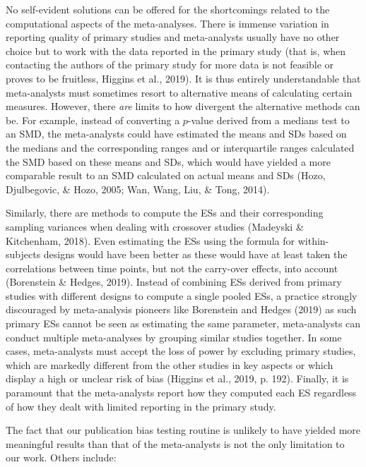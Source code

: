 \documentclass[
  man,floatsintext]{apa6}
\begin{document}
No self-evident solutions can be offered for the shortcomings related to the computational aspects of the meta-analyses. There is immense variation in reporting quality of primary studies and meta-analysts usually have no other choice but to work with the data reported in the primary study (that is, when contacting the authors of the primary study for more data is not feasible or proves to be fruitless, Higgins et al., 2019). It is thus entirely understandable that meta-analysts must sometimes resort to alternative means of calculating certain measures. However, there \emph{are} limits to how divergent the alternative methods can be. For example, instead of converting a \(p\)-value derived from a medians test to an SMD, the meta-analysts could have estimated the means and SDs based on the medians and the corresponding ranges and or interquartile ranges calculated the SMD based on these means and SDs, which would have yielded a more comparable result to an SMD calculated on actual means and SDs (Hozo, Djulbegovic, \& Hozo, 2005; Wan, Wang, Liu, \& Tong, 2014).

Similarly, there are methods to compute the ESs and their corresponding sampling variances when dealing with crossover studies (Madeyski \& Kitchenham, 2018). Even estimating the ESs using the formula for within-subjects designs would have been better as these would have at least taken the correlations between time points, but not the carry-over effects, into account (Borenstein \& Hedges, 2019).
Instead of combining ESs derived from primary studies with different designs to compute a single pooled ESs, a practice strongly discouraged by meta-analysis pioneers like Borenstein and Hedges (2019) as such primary ESs cannot be seen as estimating the same parameter, meta-analysts can conduct multiple meta-analyses by grouping similar studies together. In some cases, meta-analysts must accept the loss of power by excluding primary studies, which are markedly different from the other studies in key aspects or which display a high or unclear risk of bias (Higgins et al., 2019, p. 192). Finally, it is paramount that the meta-analysts report how they computed each ES regardless of how they dealt with limited reporting in the primary study.

The fact that our publication bias testing routine is unlikely to have yielded more meaningful results than that of the meta-analysts is not the only limitation to our work. Others include:
\end{document}
